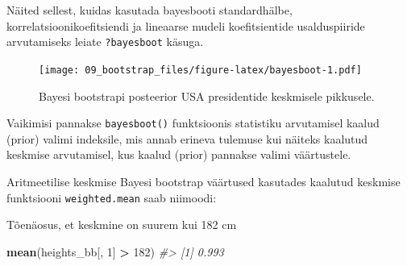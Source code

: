 \documentclass[]{book}
\newenvironment{Shaded}{\begin{snugshade}}{\end{snugshade}}
\newcommand{\KeywordTok}[1]{\textcolor[rgb]{0.13,0.29,0.53}{\textbf{#1}}}
\newcommand{\DataTypeTok}[1]{\textcolor[rgb]{0.13,0.29,0.53}{#1}}
\newcommand{\DecValTok}[1]{\textcolor[rgb]{0.00,0.00,0.81}{#1}}
\newcommand{\FloatTok}[1]{\textcolor[rgb]{0.00,0.00,0.81}{#1}}
\newcommand{\StringTok}[1]{\textcolor[rgb]{0.31,0.60,0.02}{#1}}
\newcommand{\CommentTok}[1]{\textcolor[rgb]{0.56,0.35,0.01}{\textit{#1}}}
\newcommand{\OtherTok}[1]{\textcolor[rgb]{0.56,0.35,0.01}{#1}}
\newcommand{\OperatorTok}[1]{\textcolor[rgb]{0.81,0.36,0.00}{\textbf{#1}}}
\newcommand{\NormalTok}[1]{#1}
\begin{document}
Näited sellest, kuidas kasutada bayesbooti standardhälbe,
korrelatsioonikoefitsiendi ja lineaarse mudeli koefitsientide
usalduspiiride arvutamiseks leiate \texttt{?bayesboot} käsuga.




\begin{Shaded}
\end{Shaded}

\begin{figure}
\centering
\texttt{[image: 09\_bootstrap\_files/figure-latex/bayesboot-1.pdf]}
\caption{\label{fig:bayesboot}Bayesi bootstrapi posteerior USA presidentide keskmisele
pikkusele.}
\end{figure}

\begin{Shaded}
\end{Shaded}

Vaikimisi pannakse \texttt{bayesboot()} funktsioonis statistiku
arvutamisel kaalud (prior) valimi indeksile, mis annab erineva tulemuse
kui näiteks kaalutud keskmise arvutamisel, kus kaalud (prior) pannakse
valimi väärtustele.

Aritmeetilise keskmise Bayesi bootstrap väärtused kasutades kaalutud
keskmise funktsiooni \texttt{weighted.mean} saab niimoodi:

\begin{Shaded}
\end{Shaded}

Tõenäosus, et keskmine on suurem kui 182 cm

\begin{Shaded}
\begin{Highlighting}[]
\KeywordTok{mean}\NormalTok{(heights_bb[, }\DecValTok{1}\NormalTok{] }\OperatorTok{>}\StringTok{ }\DecValTok{182}\NormalTok{)}
\CommentTok{#> [1] 0.993}
\end{Highlighting}
\end{Shaded}
\end{document}
